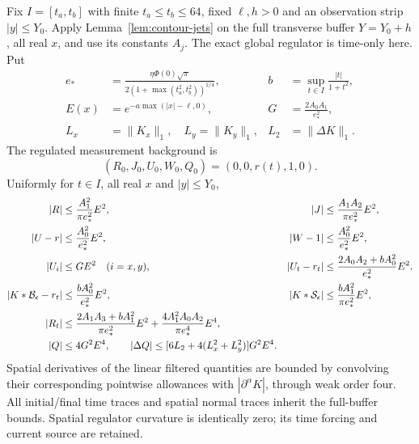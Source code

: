 \begin{theorem}\label{thm:preswitch-tail}
Fix $I=[t_a,t_b]$ with finite $t_a\le t_b\le64$, fixed $\ell,h>0$
and an observation strip $|y|\le Y_0$. Apply
Lemma~\ref{lem:contour-jets} on the full transverse buffer
$Y=Y_0+h$, all real $x$, and use its constants $A_j$.
The exact global regulator is time-only here. Put
\begin{align*}
 e_*&=\frac{\eta\Phi(0)\sqrt\pi}
 {2(1+\max(t_a^2,t_b^2))^{1/4}},&
 b&=\sup_{t\in I}\frac{|t|}{1+t^2},\\
 E(x)&=e^{-a\max(|x|-\ell,0)},&
 G&=\frac{2A_0A_1}{e_*^2},\\
 L_x&=\|K_x\|_1,\quad L_y=\|K_y\|_1,&
 L_2&=\|\Delta K\|_1.
\end{align*}
The regulated measurement background is
\begin{equation}
 (R_0,J_0,U_0,W_0,Q_0)=(0,0,r(t),1,0).
 \label{eq:preswitch-background}
\end{equation}
Uniformly for $t\in I$, all real $x$ and $|y|\le Y_0$,
\begin{align}
 |R|&\le\frac{A_1^2}{\pi e_*^2}E^2,&
 |J|&\le\frac{A_1A_2}{\pi e_*^2}E^2,\notag\\
 |U-r|&\le\frac{A_0^2}{e_*^2}E^2,&
 |W-1|&\le\frac{A_0^2}{e_*^2}E^2,\notag\\
 |U_i|&\le GE^2\quad(i=x,y),&
 |U_t-r_t|&\le\frac{2A_0A_2+bA_0^2}{e_*^2}E^2.
 \label{eq:preswitch-linear-budgets}\\
 |K*\mathcal B_\epsilon-r_t|
 &\le\frac{bA_0^2}{e_*^2}E^2,&
 |K*\mathcal S_\epsilon|&\le\frac{bA_1^2}{\pi e_*^2}E^2,
 \label{eq:preswitch-forcing}\\
 |R_t|&\le\frac{2A_1A_3+bA_1^2}{\pi e_*^2}E^2
          +\frac{4A_1^2A_0A_2}{\pi e_*^4}E^4,
 \label{eq:preswitch-density-time}\\
 |Q|&\le4G^2E^4,\qquad
 |\Delta Q|\le[6L_2+4(L_x^2+L_y^2)]G^2E^4.
 \label{eq:preswitch-covariance}
\end{align}
Spatial derivatives of the linear filtered quantities are bounded by
convolving their corresponding pointwise allowances with
$|\partial^\alpha K|$, through weak order four. All initial/final time
traces and spatial normal traces inherit the full-buffer bounds.
Spatial regulator curvature is identically zero; its time forcing and
current source are retained.
\end{theorem}
